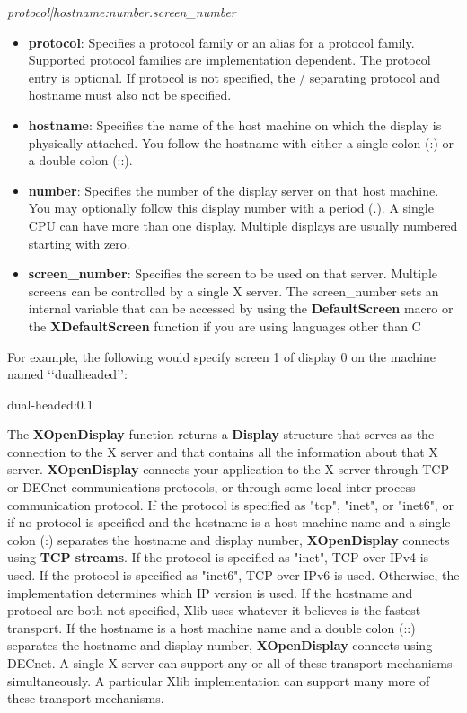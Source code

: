 \documentclass{report}
\begin{document}
\begin{itemize}
\begin{center}
                \textit{protocol|hostname:number.screen\_number}
            \end{center}
            \begin{itemize}
                \item \textbf{protocol}: Specifies a protocol family or an alias for a protocol family. Supported protocol families are implementation dependent. The protocol entry is optional. If protocol is not specified, the / separating protocol and hostname must also not be specified.
                \item \textbf{hostname}: Specifies the name of the host machine on which the display is physically attached. You follow the hostname with either a single colon (:) or a double colon (::).
                \item \textbf{number}: Specifies the number of the display server on that host machine. You may optionally follow this display number with a period (.). A single CPU can have more than one display. Multiple displays are usually numbered starting with zero.
                \item \textbf{screen\_number}: Specifies the screen to be used on that server. Multiple screens can be controlled by a single X server. The screen\_number sets an internal variable that can be accessed by using the \textbf{DefaultScreen} macro or the \textbf{XDefaultScreen} function if you are using languages other than C 
            \end{itemize}
            For example, the following would specify screen 1 of display 0 on the machine named ‘‘dualheaded’’:
            \begin{center}
                dual-headed:0.1
            \end{center}
            The \textbf{XOpenDisplay} function returns a \textbf{Display} structure that serves as the connection to the X server and that contains all the information about that X server. \textbf{XOpenDisplay} connects your application to the X server through TCP or DECnet communications protocols, or through some local inter-process communication protocol. If the protocol is specified as "tcp", "inet", or "inet6", or if no protocol is specified and the hostname is a host machine name and a single colon (:) separates the hostname and display number, \textbf{XOpenDisplay} connects using \textbf{TCP streams}.
            \bigbreak \noindent 
            If the protocol is specified as "inet", TCP over IPv4 is used. If the protocol is specified as "inet6", TCP over IPv6 is used. Otherwise, the implementation determines which IP version is used. If the hostname and protocol are both not specified, Xlib uses whatever it believes is the fastest transport. If the hostname is a host machine name and a double colon (::) separates the hostname and display number, \textbf{XOpenDisplay} connects using DECnet. A single X server can support any or all of these transport mechanisms simultaneously. A particular Xlib implementation can support many more of these transport mechanisms.

\end{itemize}
\end{document}
